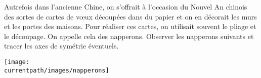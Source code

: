 \begin{enigme}
            Autrefois dans l'ancienne Chine, on s'offrait à l'occasion du Nouvel An chinois des sortes de \og cartes de v\oe ux \fg{} découpées dans du papier et on en décorait les murs et les portes des maisons. Pour réaliser ces cartes, on utilisait souvent le pliage et le découpage. On appelle cela des napperons.
            \partie[observation]
               Observer les napperons suivants et tracer les axes de symétrie éventuels.
               \begin{center}
                  \texttt{[image: \\currentpath/images/napperons]}
               \end{center}
               

\end{enigme}
